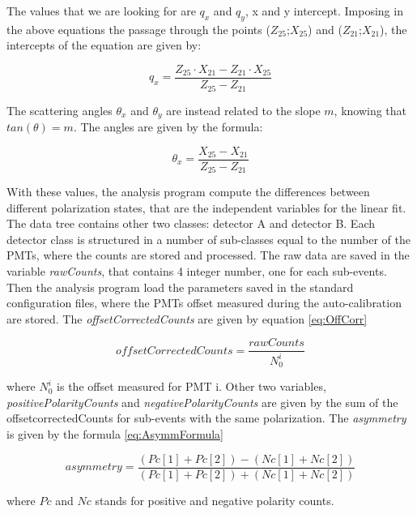 \begin{appendices}
The values that we are looking for are $q_{x}$ and $q_{y}$, x and y intercept. 
Imposing in the above equations the passage through the points ($Z_{25}$;$X_{25}$) and ($Z_{21}$;$X_{21}$), the intercepts of the equation are given by:

\begin{equation}
q_{x} = \dfrac{Z_{25} \cdot X_{21} - Z_{21} \cdot X_{25}}{Z_{25} - Z_{21}}
\end{equation} 

The scattering angles $\theta_{x}$ and $\theta_{y}$ are instead related to the slope $m$, knowing that $tan(\theta) = m$. The angles are given by the formula:

\begin{equation}
\theta_{x} = \dfrac{X_{25} - X_{21}}{Z_{25} - Z_{21}}
\end{equation}

With these values, the analysis program compute the differences between different polarization states, that are the independent variables for the linear fit. 
The data tree contains other two classes: detector A and detector B. Each detector class is structured in a number of sub-classes equal to the number of the PMTs, where the counts are stored and processed. The raw data are saved in the variable \textit{rawCounts}, that contains 4 integer number, one for each sub-events. Then the analysis program load the parameters saved in the standard configuration files, where the PMTs offset measured during the auto-calibration are stored. The \textit{offsetCorrectedCounts} are given by equation \ref{eq:OffCorr}

\begin{equation} \label{eq:OffCorr}
offsetCorrectedCounts = \dfrac{rawCounts}{N_{0}^{i}}
\end{equation} 

where $N_{0}^{i}$ is the offset measured for PMT i. Other two variables, \textit{positivePolarityCounts} and \textit{negativePolarityCounts} are given by the sum of the offsetcorrectedCounts for sub-events with the same polarization. The \textit{asymmetry} is given by the formula \ref{eq:AsymmFormula}

\begin{equation} \label{eq:AsymmFormula}
asymmetry = \dfrac{(Pc[1] + Pc[2]) - (Nc[1] + Nc[2])}{(Pc[1] + Pc[2]) + (Nc[1] + Nc[2])}
\end{equation}

where $Pc$ and $Nc$ stands for positive and negative polarity counts. 
\end{appendices}